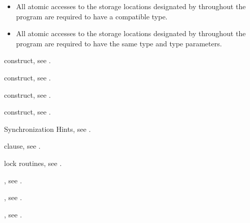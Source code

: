 \begin{ccppspecific}
\begin{itemize}
\item All atomic accesses to the storage locations designated by  
      throughout the program are required to have a compatible type.
\end{itemize}
\end{ccppspecific}

\begin{fortranspecific}
\begin{itemize}
\item All atomic accesses to the storage locations designated by  
      throughout the program are required to have the same type and type parameters.
\end{itemize}
\end{fortranspecific}

\begin{crossrefs}
\item {} construct, see
.

\item {} construct, see
.

\item {} construct, see
.

\item {} construct, see
.

\item Synchronization Hints, see
.

\item {} clause, see
.

\item lock routines, see .

\item {}, see
.

\item {}, see
.

\item {}, see
.

\end{crossrefs}



